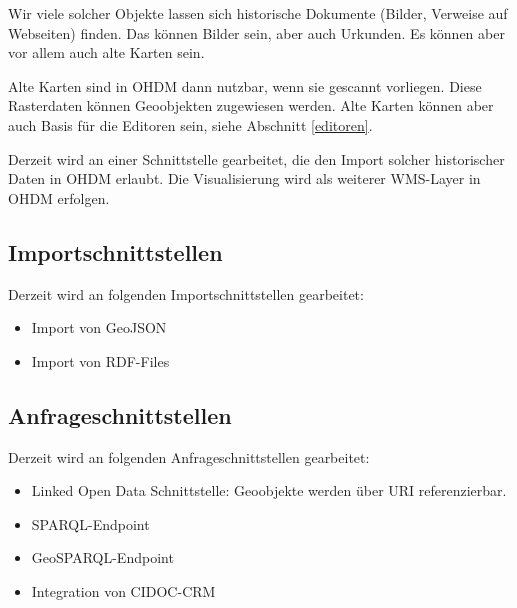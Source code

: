 Wir viele solcher Objekte lassen sich historische Dokumente (Bilder, Verweise auf Webseiten) finden.
Das können Bilder sein, aber auch Urkunden. Es können aber vor allem auch alte Karten sein.

Alte Karten sind in OHDM dann nutzbar, wenn sie gescannt vorliegen. Diese Rasterdaten können
Geoobjekten zugewiesen werden. Alte Karten können aber auch Basis für die Editoren sein, siehe 
Abschnitt \ref{editoren}.

Derzeit wird an einer Schnittstelle gearbeitet, die den Import solcher historischer Daten 
in OHDM erlaubt. Die Visualisierung wird als weiterer WMS-Layer in OHDM erfolgen.

\subsection{Importschnittstellen}
Derzeit wird an folgenden Importschnittstellen gearbeitet:

\begin{itemize}
\item
Import von GeoJSON
\item
Import von RDF-Files

\end{itemize}

\subsection{Anfrageschnittstellen}
Derzeit wird an folgenden Anfrageschnittstellen gearbeitet:

\begin{itemize}
\item
Linked Open Data Schnittstelle: Geoobjekte werden über URI referenzierbar.
\item
SPARQL-Endpoint
\item
GeoSPARQL-Endpoint
\item
Integration von CIDOC-CRM
\end{itemize}

